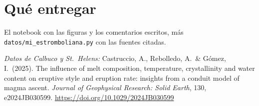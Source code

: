 \documentclass[11pt,a4paper]{article}
\begin{document}
\section*{Qué entregar}

El notebook con las figuras y los comentarios escritos,
más \texttt{datos/mi\_estromboliana.py} con las fuentes citadas.

\vspace{1.2em}
{\small
\noindent\textit{Datos de Calbuco y St.\ Helens:}
Castruccio, A., Rebolledo, A.\ \& Gómez, I.\ (2025).
The influence of melt composition, temperature, crystallinity and water
content on eruptive style and eruption rate: insights from a conduit model
of magma ascent. \emph{Journal of Geophysical Research: Solid Earth}, 130,
e2024JB030599. \url{https://doi.org/10.1029/2024JB030599}
}
\end{document}
